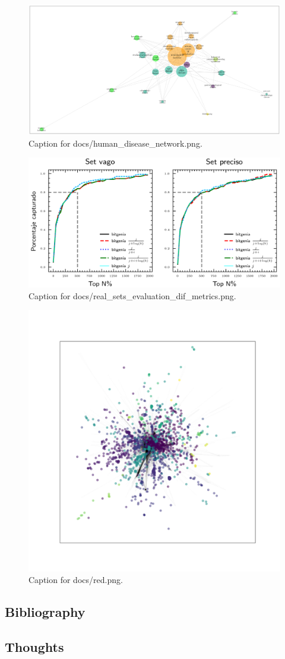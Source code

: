 \documentclass{article}
\begin{document}
\begin{figure}[h] \centering \includegraphics{docs/human_disease_network.png} \caption{Caption for docs/human_disease_network.png.} \end{figure}
\begin{figure}[h] \centering \includegraphics{docs/real_sets_evaluation_dif_metrics.png} \caption{Caption for docs/real_sets_evaluation_dif_metrics.png.} \end{figure}
\begin{figure}[h] \centering \includegraphics{docs/red.png} \caption{Caption for docs/red.png.} \end{figure}
\subsection{Bibliography}
\subsection{Thoughts}
\end{document}
